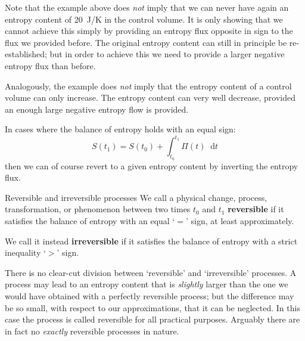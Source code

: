 \documentclass[a4paper,12pt,%
onecolumn,oneside,%
british%
]{memoir}
\newcommand*{\di}{\mathop{}\!\mathrm{d}}%
\renewcommand*{\|}[1][]{\nonscript\:#1\vert\nonscript\:\mathopen{}}
\newcommand*{\yti}{t_{0}}
\newcommand*{\ytf}{t_{1}}
\newcommand*{\dt}{\di t}
\newcommand*{\yS}{S}
\newcommand*{\yB}{\varPi}
\begin{document}
\begin{warning}
  Note that the example above does \emph{not} imply that we can never have again an entropy content of \qty{20}{J/K} in the control volume. It is only showing that we cannot achieve this simply by providing an entropy flux opposite in sign to the flux we provided before. The original entropy content can still in principle be re-established; but in order to achieve this we need to provide a larger negative entropy flux than before.

Analogously, the example does \emph{not} imply that the entropy content of a control volume can only increase. The entropy content can very well decrease, provided an enough large negative entropy flow is provided.
\end{warning}

\medskip

In cases where the balance of entropy holds with an equal sign:
\begin{equation*}
  \yS(\ytf) = \yS(\yti) + \int_{\yti}^{\ytf}\!\!\yB(t)\dt
\end{equation*}
then we can of course revert to a given entropy content by inverting the entropy flux.

\begin{definition}{Reversible and irreversible processes}\label{def:reversible}
  We call a physical change, process, transformation, or phenomenon between two times $\yti$ and $\ytf$ \textbf{reversible} if it satisfies the balance of entropy with an equal \enquote*{$=$} sign, at least approximately.

  \medskip

  We call it instead \textbf{irreversible} if it satisfies the balance of entropy with a strict inequality \enquote*{$>$} sign.

  \medskip

  There is no clear-cut division between \enquote*{reversible} and \enquote*{irreversible} processes. A process may lead to an entropy content that is \emph{slightly} larger than the one we would have obtained with a perfectly reversible process; but the difference may be so small, with respect to our approximations, that it can be neglected. In this case the process is called reversible for all practical purposes. Arguably there are in fact no \emph{exactly} reversible processes in nature.
\end{definition}

\bigskip
\end{document}
